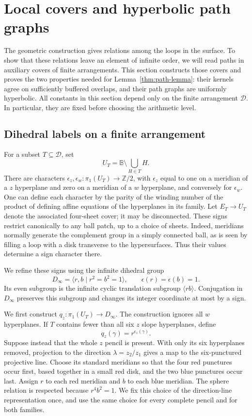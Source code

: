 \documentclass[11pt,reqno]{amsart}
\numberwithin{equation}{section}
\theoremstyle{definition}
\theoremstyle{remark}
\newcommand{\Z}{\mathbb Z}
\newcommand{\BB}{\mathbb B}
\newcommand{\cD}{\mathcal D}
\begin{document}
\section{Local covers and hyperbolic path graphs}\label{sec:models}

The geometric construction gives relations among the loops in the
surface.  To show that these relations leave an element of infinite
order, we will read paths in auxiliary covers of finite arrangements.
This section constructs those covers and proves the two properties
needed for Lemma~\ref{thm:path-lemma}: their kernels agree on sufficiently
buffered overlaps, and their path graphs are uniformly hyperbolic.
All constants in this section depend only on the finite arrangement
$\cD$.  In particular, they are fixed before choosing the arithmetic
level.

\subsection{Dihedral labels on a finite arrangement}

For a subset $T\subseteq\cD$, set
\[
 U_T=\BB\setminus\bigcup_{H\in T}H.
\]
There are characters $\epsilon_z,\epsilon_w:\pi_1(U_T)\to\Z/2$,
with $\epsilon_z$ equal to one on a meridian of a $z$ hyperplane and
zero on a meridian of a $w$ hyperplane, and conversely for
$\epsilon_w$.  One can define each character by the parity of the
winding number of the product of defining affine equations of the
hyperplanes in its family.  Let $E_T\to U_T$ denote the associated
four-sheet cover; it may be disconnected.  These signs restrict
canonically to any ball patch, up to a choice of sheets.  Indeed,
meridians normally generate the complement group in a simply connected
ball, as is seen by filling a loop with a disk transverse to the
hypersurfaces.  Thus their values determine a sign character there.

We refine these signs using the infinite dihedral group
\[
 D_\infty=\langle r,b\mid r^2=b^2=1\rangle,
 \qquad \epsilon(r)=\epsilon(b)=1.
\]
Its even subgroup is the infinite cyclic translation subgroup
$\langle rb\rangle$.  Conjugation in $D_\infty$ preserves this subgroup
and changes its integer coordinate at most by a sign.

We first construct $q_z:\pi_1(U_T)\to D_\infty$.  The construction
ignores all $w$ hyperplanes.  If $T$ contains fewer than all six $z$
slope hyperplanes, define
\[
 q_z(\gamma)=r^{\epsilon_z(\gamma)}.
\]
Suppose instead that the whole $z$ pencil is present.  With only its
six hyperplanes removed, projection to the direction
$\lambda=z_2/z_1$ gives a map to the six-punctured projective line.
Choose its standard meridians so that the four red punctures occur
first, based together in a small red disk, and the two blue punctures
occur last.  Assign $r$ to each red meridian and $b$ to each blue
meridian.  The sphere relation is respected because $r^4b^2=1$.
We fix this choice of the direction-line representation once, and use
the same choice for every complete pencil and for both families.
\end{document}
